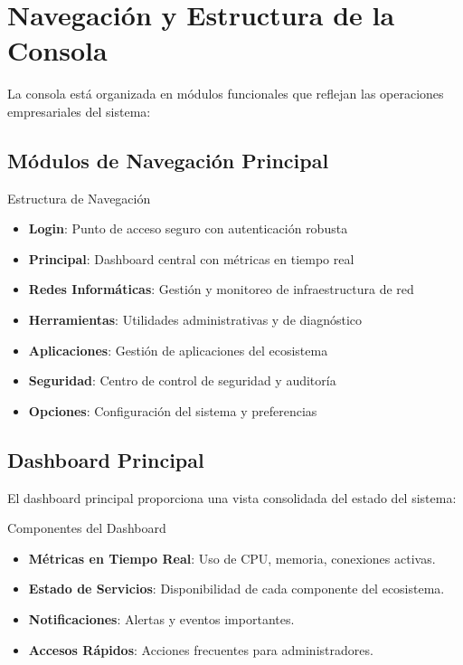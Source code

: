 \section{Navegación y Estructura de la Consola}

La consola está organizada en módulos funcionales que reflejan las operaciones empresariales del sistema:

\subsection{Módulos de Navegación Principal}

\begin{caja}{Estructura de Navegación}
\begin{itemize}
\item \textbf{Login}: Punto de acceso seguro con autenticación robusta
\item \textbf{Principal}: Dashboard central con métricas en tiempo real
\item \textbf{Redes Informáticas}: Gestión y monitoreo de infraestructura de red
\item \textbf{Herramientas}: Utilidades administrativas y de diagnóstico
\item \textbf{Aplicaciones}: Gestión de aplicaciones del ecosistema
\item \textbf{Seguridad}: Centro de control de seguridad y auditoría
\item \textbf{Opciones}: Configuración del sistema y preferencias
\end{itemize}
\end{caja}


\subsection{Dashboard Principal}

El dashboard principal proporciona una vista consolidada del estado del sistema:

\begin{caja}{Componentes del Dashboard}
\begin{itemize}
\item \textbf{Métricas en Tiempo Real}: Uso de CPU, memoria, conexiones activas.
\item \textbf{Estado de Servicios}: Disponibilidad de cada componente del ecosistema.
\item \textbf{Notificaciones}: Alertas y eventos importantes.
\item \textbf{Accesos Rápidos}: Acciones frecuentes para administradores.
\end{itemize}
\end{caja}

